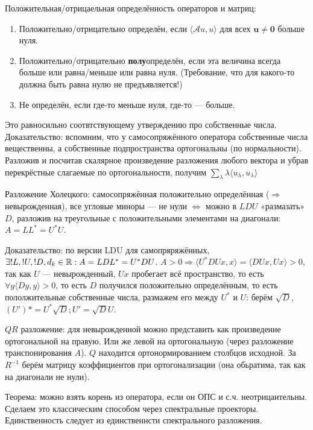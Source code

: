 \documentclass[12pt, a4paper]{article}
\begin{document}
Положительная/отрицаельная определённость операторов и матриц: 
\begin{enumerate}
    \item Положительно/отрицательно определён, если $\langle \mathcal{A} u, u \rangle$ для всех $\mathbf{u \neq 0}$ больше нуля.
    \item Положительно/отрицательно \textbf{полу}определён, если эта величина всегда больше или равна/меньше или равна нуля.
    (Требование, что для какого-то должна быть равна нулю не предъявляется!)
    \item Не определён, если где-то меньше нуля, где-то — больше.
\end{enumerate}

Это равносильно соотвтствующему утверждению про собственные числа. Доказательство: вспомним, что у самосопряжённого оператора 
собственные числа вещественны, а собственные подпространства ортогональны (по нормальности). 
Разложив и посчитав скалярное произведение разложения любого вектора и убрав перекрёстные слагаемые по ортогональности, получим $\sum_\lambda \lambda \langle u_\lambda, u_\lambda \rangle$




Разложение Холецкого: самосопряжённая положительно определённая ($\Rightarrow$ невырожденная), все угловые миноры — не нули 
$\Longleftrightarrow$ можно в $LDU$ «размазать» $D$, 
разложив на треугольные с положительными элементами на диагонали: $A = LL^* = U^*U$.

Доказательство: по версии LDU для самопряряжённых, $\exists !L, !U, !D, d_k \in {\mathbb{R}}: A = LDL^* = U^*DU$.
$A > 0 \Rightarrow \langle U^*DU x, x \rangle = \langle DU x, U x \rangle > 0$, так как $U$ — невырожденный, $Ux$ пробегает всё пространство, то есть
$\forall y \langle D y, y \rangle > 0$, то есть $D$ получился положительно определённым, то есть пололжительные собственные числа, размажем его между $U^*$ и $U$: 
берём $\sqrt{D}$, $(U')* = U^* \sqrt{D} ; U' = \sqrt{D} U$.



$QR$ разложение: для невырожденной можно представить как произведение ортогональной на правую. Или же левой на ортогональную (через разложение транспонирования $A$).
$Q$ находится ортонормированием столбцов исходной. За $R^{-1}$ берём матрицу коэффициентов при ортогонализации (она обьратима, так как на диагонали не нули).

Теорема: можно взять корень из оператора, если он ОПС и с.ч. неотрицаительны. Сделаем это классическим способом через спектральные проекторы. 
Единственность следует из единственнсти спектрального разложения.
\end{document}
